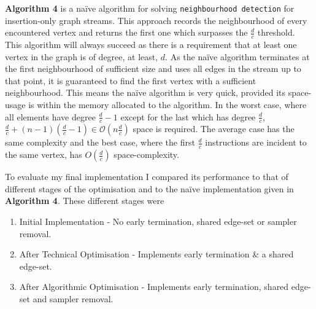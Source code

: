 \documentclass[11pt,twoside,a4paper]{report}
\begin{document}
\textbf{Algorithm 4} is a naïve algorithm for solving \texttt{neighbourhood detection} for insertion-only graph streams. This approach records the neighbourhood of every encountered vertex and returns the first one which surpasses the $\frac{d}c$ threshold. This algorithm will always succeed as there is a requirement that at least one vertex in the graph is of degree, at least, $d$. As the naïve algorithm terminates at the first neighbourhood of sufficient size and uses all edges in the stream up to that point, it is guaranteed to find the first vertex with a sufficient neighbourhood. This means the naïve algorithm is very quick, provided its space-usage is within the memory allocated to the algorithm. In the worst case, where all elements have degree $\frac{d}c-1$ except for the last which has degree $\frac{d}c$, $\frac{d}{c}+(n-1)(\frac{d}c-1)\in \mathcal{O}(n\frac{d}c)$ space is required. The average case has the same complexity and the best case, where the first $\frac{d}c$ instructions are incident to the same vertex, has $O(\frac{d}c)$ space-complexity.

To evaluate my final implementation I compared its performance to that of different stages of the optimisation and to the naïve implementation given in \textbf{Algorithm 4}. These different stages were
\begin{enumerate}[label=\roman*)]
	\item Initial Implementation - No early termination, shared edge-set or sampler removal. %
	\item After Technical Optimisation - Implements early termination \& a shared edge-set. %
	\item After Algorithmic Optimisation - Implements early termination, shared edge-set and sampler removal. %
\end{enumerate}
\end{document}
